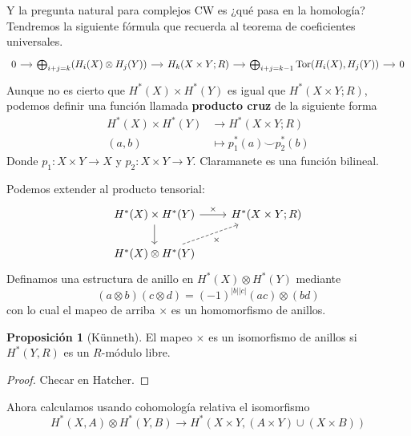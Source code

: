 \documentclass[spanish]{book}
\theoremstyle{definition}
\newtheorem*{prop}{Proposición}
\DeclareMathOperator{\Tor}{Tor}
\begin{document}
Y la pregunta natural para complejos CW es ¿qué pasa en la homología? Tendremos la siguiente fórmula que recuerda al teorema de coeficientes universales.
\[\begin{tikzcd}[column sep=small]
	0\arrow[r]&\bigoplus_{i+j=k}(H_i(X)\otimes H_j(Y))\arrow[r]&H_k(X\times Y;R)\arrow[r]&\bigoplus_{i+j=k-1}\Tor(H_i(X),H_j(Y))\arrow[r]&0
\end{tikzcd}\]
Aunque no es cierto que $H^*(X)\times H^*(Y)$ es igual que $H^*(X\times Y;R)$, podemos definir una función llamada \textbf{producto cruz} de la siguiente forma
\begin{align*}
	H^*(X)\times H^*(Y)&\to H^*(X\times Y;R)\\
	(a,b)&\mapsto p^*_1(a)\smile p_2^*(b)
\end{align*}
Donde $p_1:X\times Y\to X$ y $p_2:X\times Y\to Y$. Claramanete es una función bilineal.

Podemos extender al producto tensorial:
\[\begin{tikzcd}
	H^*(X)\times H^*(Y)\arrow[r,"\times"]\arrow[d]&H^*(X\times Y;R)\\
	H^*(X)\otimes H^*(Y)\arrow[dashed,ur,"\times",swap]
\end{tikzcd}\]
Definamos una estructura de anillo en $H^*(X)\otimes H^*(Y)$ mediante
\[(a\otimes b)(c\otimes d)=(-1)^{|b||c|}(ac)\otimes(bd)\]
con lo cual el mapeo de arriba $\times$ es un homomorfismo de anillos.
\begin{prop}[Künneth]
	El mapeo $\times$ es un isomorfismo de anillos si $H^*(Y,R)$ es un $R$-módulo libre.
\end{prop}
\begin{proof}
	Checar en Hatcher.
\end{proof}
Ahora calculamos usando cohomología relativa el isomorfismo
\[H^*(X,A)\otimes H^*(Y,B)\to H^*(X\times Y,(A\times Y)\cup (X\times B))\]
\end{document}
